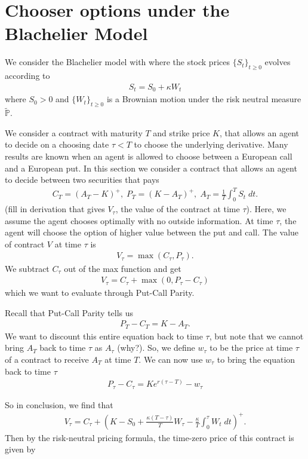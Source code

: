\documentclass[reqno]{amsart}
\begin{document}
%
\begin{nouppercase}
\maketitle
\end{nouppercase}




\tableofcontents
\setcounter{part}{0}


\section{Chooser options under the Blachelier Model}
We consider the Blachelier model with where the stock prices $\{S_t\}_{t \ge 0}$ evolves according to 
\begin{align}
	 S_t = S_0 + \kappa W_t
\end{align}
where $S_0 > 0$ and $\{W_t\}_{t \ge 0}$ is a Brownian motion under the risk neutral measure $\tilde{\mathbb{P}}$.

We consider a contract with maturity $T$ and strike price $K$, that allows an agent to decide on a choosing date $\tau < T$ to choose the underlying derivative. Many results are known when an agent is allowed to choose between a European call and a European put. In this section we consider a contract that allows an agent to decide between two securities that pays 
\begin{align}
     C_T = (A_T - K)^+, \; P_T = (K - A_T)^+, \; A_T = \frac{1}{T} \int_0^T S_t \; dt.
\end{align}
(fill in derivation that gives $V_\tau$, the value of the contract at time $\tau$).
Here, we assume the agent chooses optimally with no outside information. At time $\tau$, the agent will choose the option of higher value between the put and call. The value of contract $V$ at time $\tau$ is 
\begin{align}
     V_\tau = \max(C_\tau, P_\tau).
\end{align}
We subtract $C_\tau$ out of the max function and get
\begin{align}
     V_\tau = C_\tau + \max(0, P_\tau - C_\tau)
\end{align}
which we want to evaluate through Put-Call Parity.

Recall that Put-Call Parity tells us
\begin{align}
     P_T - C_T = K - A_T. 
\end{align}
We want to discount this entire equation back to time $\tau$, but note that we cannot bring $A_T$ back to time $\tau$ as $A_\tau$ (why?). So, we define $w_\tau$ to be the price at time $\tau$ of a contract to receive $A_T$ at time $T$. We can now use $w_\tau$ to bring the equation back to time $\tau$
\begin{align}
     P_\tau - C_\tau = Ke^{r(\tau - T)} - w_\tau
\end{align}

So in conclusion, we find that 
\begin{align}
     V_\tau = C_\tau + \left(K- S_0 + \frac{\kappa(T-\tau)}{T} W_\tau - \frac{\kappa}{T} \int_0^\tau W_t \; dt  \right)^+.
\end{align}
Then by the risk-neutral pricing formula, the time-zero price of this contract is given by 
\end{document}
